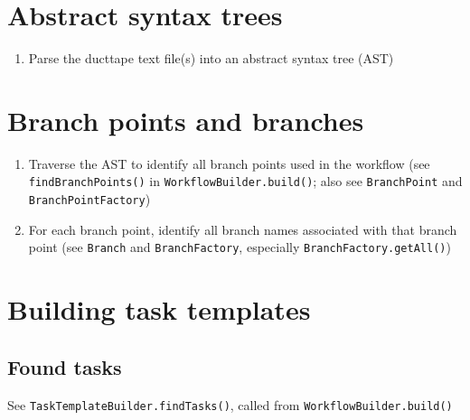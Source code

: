 \documentclass{report}
\begin{document}
\section{Abstract syntax trees}

\begin{enumerate}
\item Parse the ducttape text file(s) into an abstract syntax tree (AST)
\end{enumerate} 

\section{Branch points and branches}

\begin{enumerate}

\item Traverse the AST to identify all branch points used in the workflow 
      (see \texttt{findBranchPoints()} in \texttt{WorkflowBuilder.build()}; also 
       see \texttt{BranchPoint} and \texttt{BranchPointFactory})

\item For each branch point, identify all branch names associated with that branch point 
      (see \texttt{Branch} and \texttt{BranchFactory}, especially \texttt{BranchFactory.getAll()})

\end{enumerate}


\section{Building task templates}

\subsection{Found tasks}

See \texttt{TaskTemplateBuilder.findTasks()}, called from \texttt{WorkflowBuilder.build()}
\end{document}
